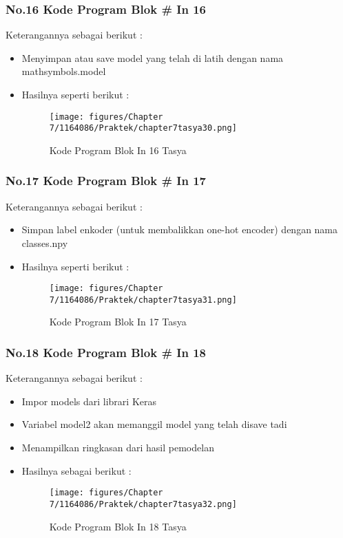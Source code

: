 \subsubsection{No.16 Kode Program Blok \# In 16}

Keterangannya sebagai berikut :
\begin{itemize}
\item Menyimpan atau save model yang telah di latih dengan nama mathsymbols.model 
\item Hasilnya seperti berikut :
\begin{figure}[ht]
\centering
\texttt{[image: figures/Chapter 7/1164086/Praktek/chapter7tasya30.png]}
\caption{Kode Program Blok In 16 Tasya}
\label{Praktek}
\end{figure}
\end{itemize}

\subsubsection{No.17 Kode Program Blok \# In 17}

Keterangannya sebagai berikut :
\begin{itemize}
\item Simpan label enkoder (untuk membalikkan one-hot encoder) dengan nama classes.npy
\item Hasilnya seperti berikut :
\begin{figure}[ht]
\centering
\texttt{[image: figures/Chapter 7/1164086/Praktek/chapter7tasya31.png]}
\caption{Kode Program Blok In 17 Tasya}
\label{Praktek}
\end{figure}
\end{itemize}

\subsubsection{No.18 Kode Program Blok \# In 18}

Keterangannya sebagai berikut :
\begin{itemize}
\item Impor models dari librari Keras
\item Variabel model2 akan memanggil model yang telah disave tadi 
\item Menampilkan ringkasan dari hasil pemodelan
\item Hasilnya sebagai berikut :
\begin{figure}[ht]
\centering
\texttt{[image: figures/Chapter 7/1164086/Praktek/chapter7tasya32.png]}
\caption{Kode Program Blok In 18 Tasya}
\label{Praktek}
\end{figure}
\end{itemize}

